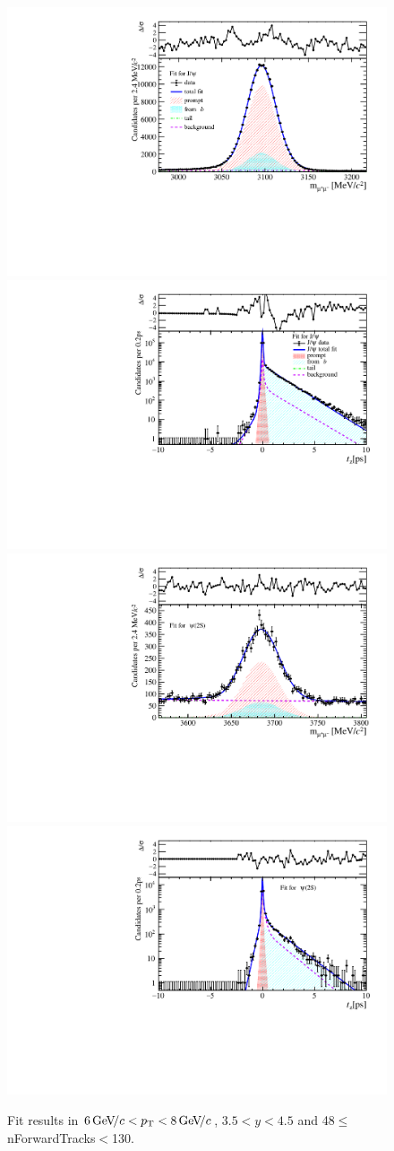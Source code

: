 \begin{figure}[H]
\begin{center}
\includegraphics[width=0.47\linewidth]{pdf/Jpsi/drawmassF/n5y3pt4.pdf}
\includegraphics[width=0.47\linewidth]{pdf/Jpsi/2DFitF/n5y3pt4.pdf}
\vspace*{-0.5cm}
\includegraphics[width=0.47\linewidth]{pdf/Psi2S/drawmassF/n5y3pt4.pdf}
\includegraphics[width=0.47\linewidth]{pdf/Psi2S/2DFitF/n5y3pt4.pdf}
\vspace*{-0.5cm}
\end{center}
\caption{Fit results in $6\text{\,Ge\kern -0.1em V\!/}c<p_{\mathrm{T}}<8\text{\,Ge\kern -0.1em V\!/}c$, $3.5<y<4.5$ and 48$\leq$nForwardTracks$<$130.}
\label{Fitn5y3pt4}
\end{figure}
